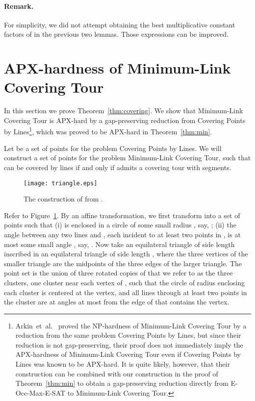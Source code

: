 \documentclass[letterpaper,11pt]{article}
\def\etal{{et~al.}}
\begin{document}
\paragraph{Remark.} For simplicity, we did not attempt obtaining
the best multiplicative constant factors of  in the previous two
lemmas. Those expressions can be improved. 


\section{APX-hardness of {\sc Minimum-Link Covering Tour}}

In this section we prove Theorem~\ref{thm:covering}.
We show that {\sc Minimum-Link Covering Tour} is APX-hard
by a gap-preserving reduction from {\sc Covering Points by Lines}\footnote{Arkin~\etal~\cite{AMP03} proved the NP-hardness of
{\sc Minimum-Link Covering Tour} by a reduction from the same problem
{\sc Covering Points by Lines}, 
but since their reduction is not gap-preserving,
their proof does not immediately imply the APX-hardness of
{\sc Minimum-Link Covering Tour} even if {\sc Covering Points by
  Lines} was known to be APX-hard. 
It is quite likely, however, that their construction can be combined with
our construction in the proof of Theorem~\ref{thm:min}
to obtain a gap-preserving reduction
directly from {\sc E-Occ-Max-E-SAT} to {\sc Minimum-Link Covering Tour}.},
which was proved to be APX-hard in Theorem~\ref{thm:min}.

Let  be a set of  points for the problem {\sc Covering Points by Lines}.
We will construct a set  of  points for the problem
{\sc Minimum-Link Covering Tour},
such that  can be covered by  lines if and only if
 admits a covering tour with  segments.

\begin{figure}[htb]
\centering\texttt{[image: triangle.eps]}
\caption{The construction of  from .}
\label{fig:triangle}
\end{figure}

Refer to Figure~\ref{fig:triangle}.
By an affine transformation, we first transform 
into a set  of  points such that
(i)  is enclosed in a circle of some small radius , say, ;
(ii) the angle between any two lines  and ,
each incident to at least two points in ,
is at most some small angle , say, .
Now take an equilateral triangle  of side length  inscribed
in an equilateral triangle  of side length ,
where the three vertices of the smaller triangle are the midpoints of
the three edges of the larger triangle.
The point set  is the union of three rotated copies of  that we refer
to as the three clusters,
one cluster near each vertex of ,
such that the circle of radius  enclosing each cluster is centered
at the vertex,
and all lines through at least two points in the cluster are at angles at most
 from the edge of  that contains the vertex.
\end{document}
